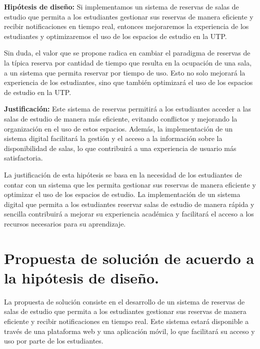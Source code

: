\documentclass{article}
\begin{document}
  \textbf{Hipótesis de diseño:} Si implementamos un sistema de reservas de salas de estudio que permita a los estudiantes gestionar sus reservas de manera eficiente y recibir notificaciones en tiempo real, entonces mejoraremos la experiencia de los estudiantes y optimizaremos el uso de los espacios de estudio en la UTP.

  Sin duda, el valor que se propone radica en cambiar el paradigma de reservas de la típica reserva por cantidad de tiempo que resulta en la ocupación de una sala, a un sistema que permita reservar por tiempo de uso. Esto no solo mejorará la experiencia de los estudiantes, sino que también optimizará el uso de los espacios de estudio en la UTP.

  \textbf{Justificación:} Este sistema de reservas permitirá a los estudiantes acceder a las salas de estudio de manera más eficiente, evitando conflictos y mejorando la organización en el uso de estos espacios. Además, la implementación de un sistema digital facilitará la gestión y el acceso a la información sobre la disponibilidad de salas, lo que contribuirá a una experiencia de usuario más satisfactoria.

  La justificación de esta hipótesis se basa en la necesidad de los estudiantes de contar con un sistema que les permita gestionar sus reservas de manera eficiente y optimizar el uso de los espacios de estudio. La implementación de un sistema digital que permita a los estudiantes reservar salas de estudio de manera rápida y sencilla contribuirá a mejorar su experiencia académica y facilitará el acceso a los recursos necesarios para su aprendizaje.

  \section{Propuesta de solución de acuerdo a la hipótesis de diseño.}

  La propuesta de solución consiste en el desarrollo de un sistema de reservas de salas de estudio que permita a los estudiantes gestionar sus reservas de manera eficiente y recibir notificaciones en tiempo real. Este sistema estará disponible a través de una plataforma web y una aplicación móvil, lo que facilitará su acceso y uso por parte de los estudiantes.
\end{document}
